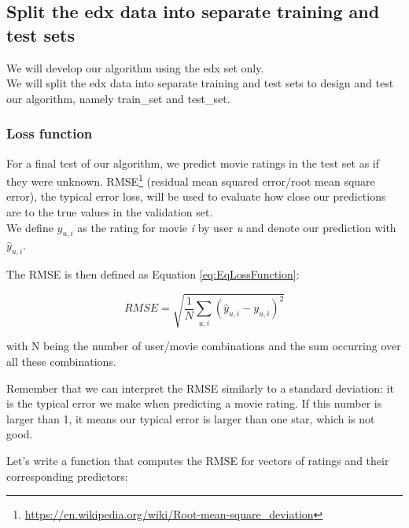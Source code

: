 \documentclass[
]{article}
\DeclareRobustCommand{\href}[2]{#2\footnote{\url{#1}}}
\begin{document}
\hypertarget{split-the-edx-data-into-separate-training-and-test-sets}{%
\subsection{Split the edx data into separate training and test
sets}\label{split-the-edx-data-into-separate-training-and-test-sets}}

We will develop our algorithm using the edx set only.\\
We will split the edx data into separate training and test sets to
design and test our algorithm, namely train\_set and test\_set.

\hypertarget{loss-function}{%
\subsubsection{Loss function}\label{loss-function}}

For a final test of our algorithm, we predict movie ratings in the test
set as if they were unknown.
\href{https://en.wikipedia.org/wiki/Root-mean-square_deviation}{RMSE}
(residual mean squared error/root mean square error), the typical error
loss, will be used to evaluate how close our predictions are to the true
values in the validation set.\\
We define \({y_{u,i}}\) as the rating for movie \emph{i} by user
\emph{u} and denote our prediction with \({\hat{y}_{u,i}}\).

The RMSE is then defined as Equation \ref{eq:EqLossFunction}:

%
\par

\label{eq:EqLossFunction} \begin{equation}
  RMSE=\sqrt{\frac{1}{N}\sum_{u,i}(\hat{y}_{u,i}-y_{u,i})^{2}}
\end{equation}

with N being the number of user/movie combinations and the sum occurring
over all these combinations.

Remember that we can interpret the RMSE similarly to a standard
deviation: it is the typical error we make when predicting a movie
rating. If this number is larger than 1, it means our typical error is
larger than one star, which is not good.

Let's write a function that computes the RMSE for vectors of ratings and
their corresponding predictors:
\end{document}
